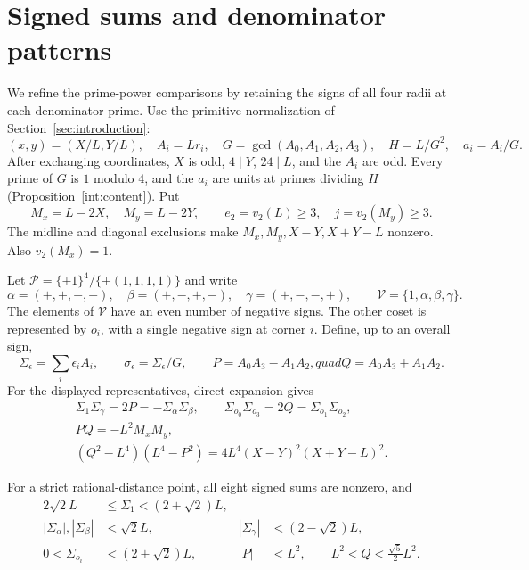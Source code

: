 \section{Signed sums and denominator patterns}
\label{sec:denominator-patterns}

We refine the prime-power comparisons by retaining the signs of all
four radii at each denominator prime.  Use the primitive normalization
of Section~\ref{sec:introduction}:
\[
 (x,y)=(X/L,Y/L),\quad A_i=Lr_i,\quad
 G=\gcd(A_0,A_1,A_2,A_3),\quad H=L/G^2,\quad a_i=A_i/G.
\]
After exchanging coordinates, $X$ is odd, $4\mid Y$, $24\mid L$,
and the $A_i$ are odd.  Every prime of $G$ is $1$ modulo $4$,
and the $a_i$ are units at primes dividing $H$
(Proposition~\ref{int:content}).  Put
\[
 M_x=L-2X,\quad M_y=L-2Y,\qquad
 e_2=v_2(L)\geq3,\quad j=v_2(M_y)\geq3.
\]
The midline and diagonal exclusions make $M_x,M_y,X-Y,X+Y-L$
nonzero.  Also $v_2(M_x)=1$.

Let $\mathcal P=\{\pm1\}^4/\{\pm(1,1,1,1)\}$ and write
\[
 \alpha=(+,+,-,-),\quad \beta=(+,-,+,-),\quad
 \gamma=(+,-,-,+),\qquad
 \mathcal V=\{1,\alpha,\beta,\gamma\}.
\]
The elements of $\mathcal V$ have an even number of negative signs.
The other coset is represented by $o_i$, with a single negative
sign at corner $i$.  Define, up to an overall sign,
\[
 \Sigma_\epsilon=\sum_i\epsilon_i A_i,
 \qquad \sigma_\epsilon=\Sigma_\epsilon/G,
 \qquad P=A_0A_3-A_1A_2,quad Q=A_0A_3+A_1A_2.
\]
For the displayed representatives, direct expansion gives
\begin{equation}
 \begin{gathered}
 \Sigma_1\Sigma_\gamma=2P=-\Sigma_\alpha\Sigma_\beta,
 \qquad
 \Sigma_{o_0}\Sigma_{o_3}=2Q=\Sigma_{o_1}\Sigma_{o_2},\\
 PQ=-L^2M_xM_y,\\
 (Q^2-L^4)(L^4-P^2)
   =4L^4(X-Y)^2(X+Y-L)^2.
 \end{gathered}
 \label{eq:pat-product-identities}
\end{equation}

\begin{lemma}
\label{lem:pat-real-bounds}
For a strict rational-distance point, all eight signed sums are nonzero,
and
\[
 \begin{aligned}
 2\sqrt2L&\leq\Sigma_1<(2+\sqrt2)L,\\
 |\Sigma_\alpha|,|\Sigma_\beta|&<\sqrt2L,
 &|\Sigma_\gamma|&<(2-\sqrt2)L,\\
 0<\Sigma_{o_i}&<(2+\sqrt2)L,
 &|P|&<L^2,\qquad L^2<Q<\frac{\sqrt5}{2}L^2.
 \end{aligned}
\]
\end{lemma}

